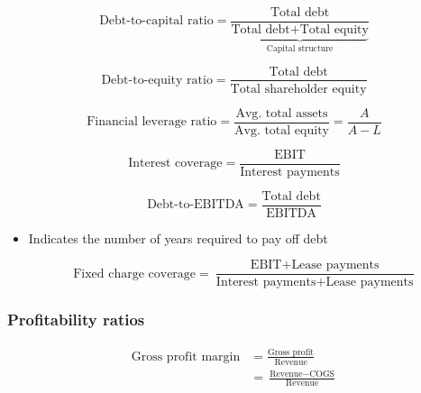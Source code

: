 \documentclass[../notes_compiled.tex]{subfiles}
\begin{document}
\begin{equation*}
\text{Debt-to-capital ratio} = \frac{\text{Total debt}}{\underbrace{\text{Total debt} + \text{Total equity}}_{\text{Capital structure}}}
\end{equation*}

\begin{equation*}
\text{Debt-to-equity ratio} = \frac{\text{Total debt}}{\text{Total shareholder equity}}
\end{equation*}

\begin{equation*}
\text{Financial leverage ratio} = \frac{\text{Avg. total assets}}{\text{Avg. total equity}} = \frac{A}{A-L}
\end{equation*}

\begin{equation*}
\text{Interest coverage} = \frac{\text{EBIT}}{\text{Interest payments}}
\end{equation*}

\begin{equation*}
\text{Debt-to-EBITDA} = \frac{\text{Total debt}}{\text{EBITDA}}
\end{equation*}
\begin{itemize}
\item Indicates the number of years required to pay off debt

\begin{equation*}
\text{Fixed charge coverage} = \frac{\text{EBIT}+\text{Lease payments}}{\text{Interest payments}+\text{Lease payments}}
\end{equation*}

\end{itemize}

\subsubsection{Profitability ratios}

\begin{align*}
\text{Gross profit margin} &= \frac{\text{Gross profit}}{\text{Revenue}} \\
&=\frac{\text{Revenue}-\text{COGS}}{\text{Revenue}}
\end{align*}
\end{document}
